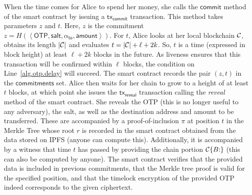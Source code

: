 When the time comes for Alice to spend her money, she calls the $\textsf{commit}$ method
of the smart contract by issuing a $\textsf{tx}_\textsf{commit}$ transaction. This
method takes parameters $z$ and $t$. Here, $z$ is the commitment
$z = H(\left<\textsf{OTP}, \textsf{salt}, \alpha_{\textsf{to}}, \textsf{amount}\right>)$.
For $t$, Alice looks at her local blockchain $\mathcal{C}$, obtains its length $|\mathcal{C}|$
and evaluates $t = |\mathcal{C}| + \ell + 2k$.
So, $t$ is a time (expressed in block height) at least $\ell + 2k$ blocks in the future.
As liveness ensures that this transaction will be confirmed within $\ell$ blocks,
the condition on Line~\ref{alg.otp.delay} will succeed.
The smart contract records the pair $(z, t)$ in the $\textsf{commitments}$ set.
Alice then waits for her chain to grow to a height of at least $t$ blocks,
at which point she issues the $\textsf{tx}_\textsf{reveal}$ transaction
calling the \emph{reveal} method of the smart contract. She reveals
the OTP (this is no longer useful to any adversary), the salt, as well as
the destination address and amount to be transferred. These are accompanied
by a proof-of-inclusion $\pi$ at position $t$ in the Merkle Tree whose root $r$
is recorded in the smart contract obtained from the data stored on IPFS
(anyone can compute this). Additionally, it is accompanied by a witness that
time $t$ has passed by providing the chain portion $\mathcal{C}\{B{:}\}$ (this can
also be computed by anyone). The smart contract verifies that the provided
data is included in previous commitments, that the Merkle tree proof is
valid for the specified position, and that the timelock encryption of the
provided OTP indeed corresponds to the given ciphertext.

